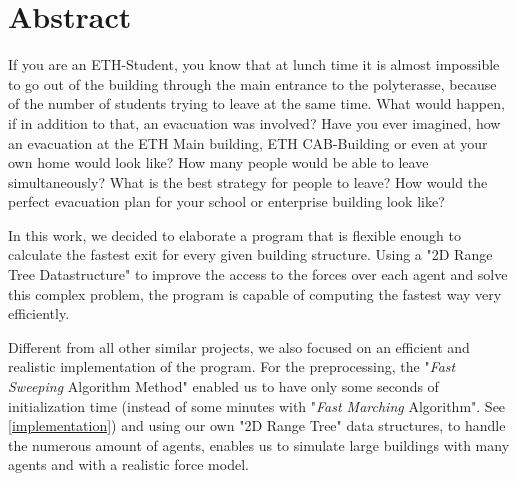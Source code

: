 \documentclass[11pt]{article}
\begin{document}






\tableofcontents

\newpage




\section{Abstract}

If you are an ETH-Student, you know that at lunch time it is almost impossible 
to go out of the building through the main entrance to the polyterasse, because
of the number of students trying to leave at the same time. What would happen,
if in addition to that, an evacuation was involved? Have you ever imagined, how
an evacuation at the ETH Main building, ETH CAB-Building or even at your own home
would look like? How many people would be able to leave simultaneously? What is the
best strategy for people to leave? How would the perfect evacuation plan for your
school or enterprise building look like?

In this work, we decided to elaborate a program that is flexible enough to
calculate the fastest exit for every given building structure. Using a "2D Range Tree Datastructure" 
to improve the access to the forces over each agent and solve this complex problem, the program is capable of computing the fastest way
very efficiently.


Different from all other similar projects, we also focused on an efficient and
realistic implementation of the program. For the preprocessing, the "\textit{Fast
Sweeping} Algorithm Method" 
enabled us to have only some seconds of initialization time (instead of some
minutes with "\textit{Fast Marching} Algorithm". 
See \ref{implementation}) and using our own "2D Range Tree" data structures, to
handle the numerous amount of agents, enables us to simulate large buildings with many agents and
with a realistic force model.
\end{document}
